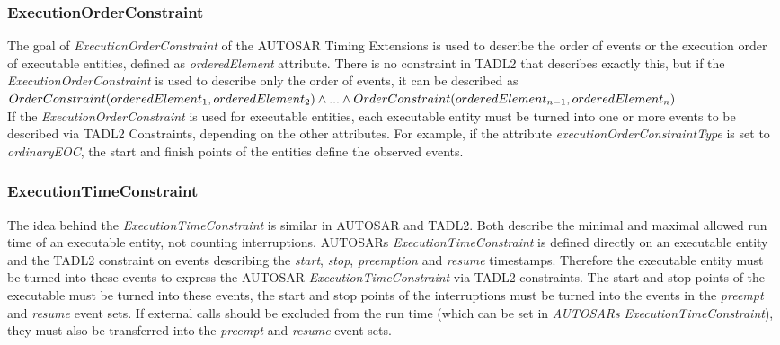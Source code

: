 	\subsubsection{ExecutionOrderConstraint}
		The goal of \emph{ExecutionOrderConstraint} of the AUTOSAR Timing Extensions is used to describe the order of events or the execution order of executable entities, defined as \emph{orderedElement} attribute. There is no constraint in TADL2 that describes exactly this, but if the \emph{ExecutionOrderConstraint} is used to describe only the order of events, it can be described as \\[10pt]
		\begin{math}
			OrderConstraint(orderedElement_1, orderedElement_2)\\
			\land ... \land\\
			OrderConstraint(orderedElement_{n-1}, orderedElement_n)
		\end{math}\\[10pt]
		If the \emph{ExecutionOrderConstraint} is used for executable entities, each executable entity must be turned into one or more events to be described via TADL2 Constraints, depending on the other attributes. For example, if the attribute \emph{executionOrderConstraintType} is set to \emph{ordinaryEOC}, the start and finish points of the entities define the observed events.
		
	\subsubsection{ExecutionTimeConstraint}
		The idea behind the \emph{ExecutionTimeConstraint} is similar in AUTOSAR and TADL2. Both describe the minimal and maximal allowed run time of an executable entity, not counting interruptions. AUTOSARs \emph{ExecutionTimeConstraint} is defined directly on an executable entity and the TADL2 constraint on events describing the \emph{start}, \emph{stop}, \emph{preemption} and \emph{resume} timestamps. Therefore the executable entity must be turned into these events to express the AUTOSAR \emph{ExecutionTimeConstraint} via TADL2 constraints. The start and stop points of the executable must be turned into these events, the start and stop points of the interruptions must be turned into the events in the \emph{preempt} and \emph{resume} event sets. If external calls should be excluded from the run time (which can be set in \textit{AUTOSARs} \emph{ExecutionTimeConstraint}), they must also be transferred into the \emph{preempt} and \emph{resume} event sets.

